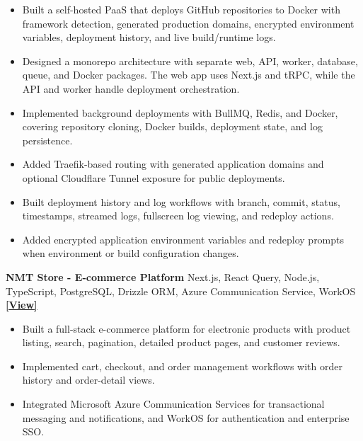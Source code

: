 \documentclass[10pt,a4paper]{article}
\newcommand{\projectEntry}[3]{
    \textbf{#1} \hfill #2 \quad
    \href{#3}{\textbf{[View]}}
}
\begin{document}
\begin{itemize}
    \item Built a self-hosted PaaS that deploys GitHub repositories to Docker with framework detection, generated production domains, encrypted environment variables, deployment history, and live build/runtime logs.
    
    \item Designed a monorepo architecture with separate web, API, worker, database, queue, and Docker packages. The web app uses Next.js and tRPC, while the API and worker handle deployment orchestration.
    
    \item Implemented background deployments with BullMQ, Redis, and Docker, covering repository cloning, Docker builds, deployment state, and log persistence.
    
    \item Added Traefik-based routing with generated application domains and optional Cloudflare Tunnel exposure for public deployments.
    
    \item Built deployment history and log workflows with branch, commit, status, timestamps, streamed logs, fullscreen log viewing, and redeploy actions.
    
    \item Added encrypted application environment variables and redeploy prompts when environment or build configuration changes.
\end{itemize}


\projectEntry
{NMT Store - E-commerce Platform}
{Next.js, React Query, Node.js, TypeScript, PostgreSQL, Drizzle ORM, Azure Communication Service, WorkOS}
{https://nmtstore-nmt-store-web.vercel.app/}

\begin{itemize}
    \item Built a full-stack e-commerce platform for electronic products with product listing, search, pagination, detailed product pages, and customer reviews.
    
    \item Implemented cart, checkout, and order management workflows with order history and order-detail views.
    
    \item Integrated Microsoft Azure Communication Services for transactional messaging and notifications, and WorkOS for authentication and enterprise SSO.
\end{itemize}
\end{document}

